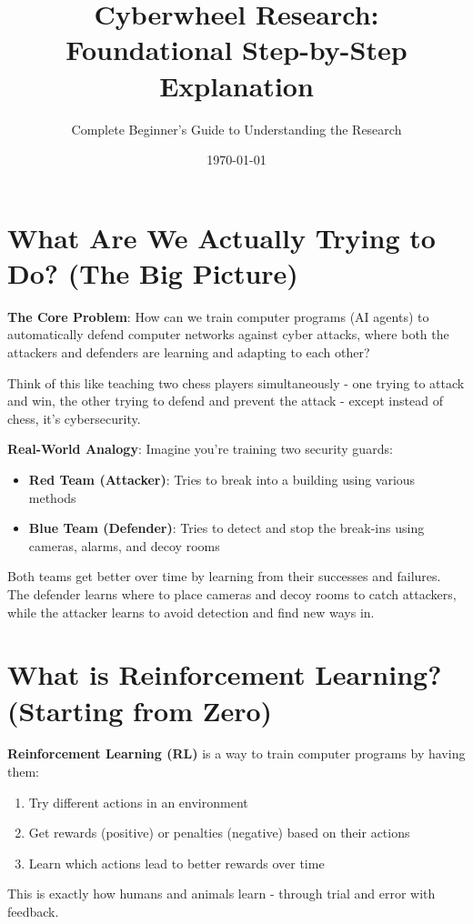 \documentclass[11pt]{article}
\title{Cyberwheel Research: Foundational Step-by-Step Explanation}
\author{Complete Beginner's Guide to Understanding the Research}
\date{\today}
\begin{document}
\maketitle

\tableofcontents

\section{What Are We Actually Trying to Do? (The Big Picture)}

\begin{foundation}
\textbf{The Core Problem}: How can we train computer programs (AI agents) to automatically defend computer networks against cyber attacks, where both the attackers and defenders are learning and adapting to each other?

Think of this like teaching two chess players simultaneously - one trying to attack and win, the other trying to defend and prevent the attack - except instead of chess, it's cybersecurity.
\end{foundation}

\begin{intuition}
\textbf{Real-World Analogy}: Imagine you're training two security guards:
\begin{itemize}
\item \textbf{Red Team (Attacker)}: Tries to break into a building using various methods
\item \textbf{Blue Team (Defender)}: Tries to detect and stop the break-ins using cameras, alarms, and decoy rooms
\end{itemize}

Both teams get better over time by learning from their successes and failures. The defender learns where to place cameras and decoy rooms to catch attackers, while the attacker learns to avoid detection and find new ways in.
\end{intuition}

\section{What is Reinforcement Learning? (Starting from Zero)}

\begin{foundation}
\textbf{Reinforcement Learning (RL)} is a way to train computer programs by having them:
\begin{enumerate}
\item Try different actions in an environment
\item Get rewards (positive) or penalties (negative) based on their actions
\item Learn which actions lead to better rewards over time
\end{enumerate}

This is exactly how humans and animals learn - through trial and error with feedback.
\end{foundation}
\end{document}
